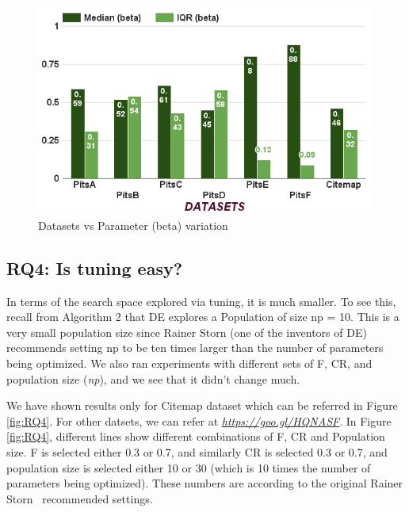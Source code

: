 \documentclass[conference]{IEEEtran}
\theoremstyle{break}
\begin{document}
\begin{center}
\begin{figure}[!h]
  \includegraphics[width=\linewidth]{./fig/Parameters_variation_b.png}
  \caption{Datasets vs Parameter (beta) variation}
  \label{RQ3:b}
\end{figure}
\end{center}

\subsection{\textbf{RQ4: Is  tuning  easy?}}

In terms of the search space explored via tuning, it is much smaller. To see this, recall from Algorithm 2 that DE explores a Population of size np = 10. This is a very small population size since Rainer Storn (one of the inventors of DE) recommends setting np to be ten times larger than the number of parameters being optimized. We also ran experiments with different sets of F, CR, and population size (\textit{np}), and we see that it didn't change much.

We have shown results only for Citemap dataset which can be referred in Figure \ref{fig:RQ4}. For other datsets, we can refer at \href{https://goo.gl/HQNASF}{\textit{https://goo.gl/HQNASF}}. In Figure \ref{fig:RQ4}, different lines show different combinations of F, CR and Population size. F is selected either 0.3 or 0.7, and similarly CR is selected 0.3 or 0.7, and population size is selected either 10 or 30 (which is 10 times the number of parameters being optimized). These numbers are according to the original Rainer Storn~\cite{storn1997differential} recommended settings.
\end{document}
